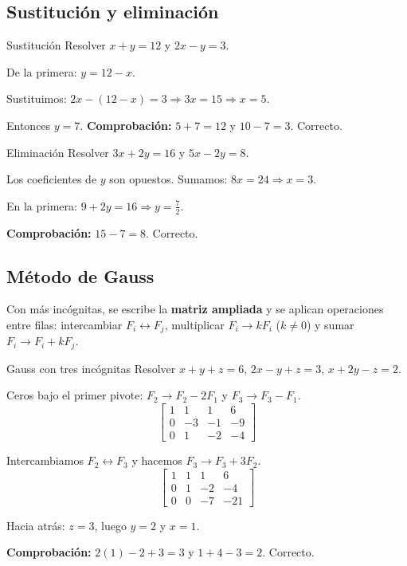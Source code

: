 \subsection{Sustituci\'on y eliminaci\'on}
\begin{tmejemplo}{Sustituci\'on}
Resolver $x+y=12$ y $2x-y=3$.
\begin{tmpasos}
\item De la primera: $y=12-x$.
\item Sustituimos: $2x-(12-x)=3\Rightarrow 3x=15\Rightarrow x=5$.
\item Entonces $y=7$. \textbf{Comprobaci\'on:} $5+7=12$ y $10-7=3$. Correcto.
\end{tmpasos}
\end{tmejemplo}

\begin{tmejemplo}{Eliminaci\'on}
Resolver $3x+2y=16$ y $5x-2y=8$.
\begin{tmpasos}
\item Los coeficientes de $y$ son opuestos. Sumamos: $8x=24\Rightarrow x=3$.
\item En la primera: $9+2y=16\Rightarrow y=\frac72$.
\item \textbf{Comprobaci\'on:} $15-7=8$. Correcto.
\end{tmpasos}
\end{tmejemplo}

\subsection{M\'etodo de Gauss}
Con m\'as inc\'ognitas, se escribe la \textbf{matriz ampliada} y se aplican operaciones entre filas: intercambiar $F_i\leftrightarrow F_j$, multiplicar $F_i\to kF_i$ ($k\neq0$) y sumar $F_i\to F_i+kF_j$.

\begin{tmejemplo}{Gauss con tres inc\'ognitas}
Resolver $x+y+z=6$, $2x-y+z=3$, $x+2y-z=2$.
\begin{tmpasos}
\item Ceros bajo el primer pivote: $F_2\to F_2-2F_1$ y $F_3\to F_3-F_1$.
\[\begin{bmatrix}1&1&1&6\\0&-3&-1&-9\\0&1&-2&-4\end{bmatrix}\]
\item Intercambiamos $F_2\leftrightarrow F_3$ y hacemos $F_3\to F_3+3F_2$.
\[\begin{bmatrix}1&1&1&6\\0&1&-2&-4\\0&0&-7&-21\end{bmatrix}\]
\item Hacia atr\'as: $z=3$, luego $y=2$ y $x=1$.
\item \textbf{Comprobaci\'on:} $2(1)-2+3=3$ y $1+4-3=2$. Correcto.
\end{tmpasos}
\end{tmejemplo}


